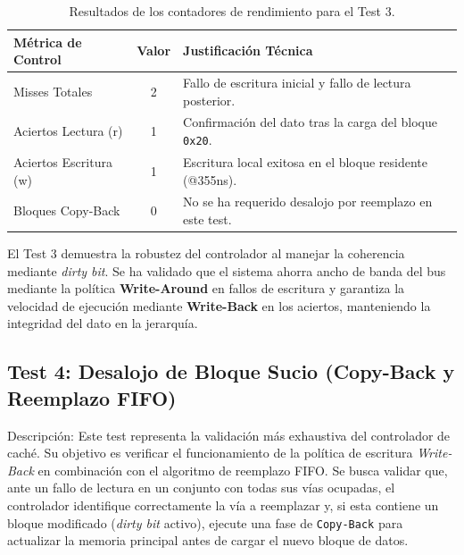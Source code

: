 \documentclass[12pt,a4paper]{article}
\begin{document}
\begin{table}[H]
\centering
\small
\renewcommand{\arraystretch}{1.2}
\begin{tabular}{|l|c|l|}
\hline
\rowcolor[HTML]{EFEFEF} 
\textbf{Métrica de Control} & \textbf{Valor} & \textbf{Justificación Técnica} \\ \hline
Misses Totales & 2 & Fallo de escritura inicial y fallo de lectura posterior. \\ \hline
Aciertos Lectura (r) & 1 & Confirmación del dato tras la carga del bloque \texttt{0x20}. \\ \hline
Aciertos Escritura (w) & 1 & Escritura local exitosa en el bloque residente (@355ns). \\ \hline
Bloques Copy-Back & 0 & No se ha requerido desalojo por reemplazo en este test. \\ \hline
\end{tabular}
\caption{Resultados de los contadores de rendimiento para el Test 3.}
\end{table}


El Test 3 demuestra la robustez del controlador al manejar la coherencia mediante \textit{dirty bit}. Se ha validado que el sistema ahorra ancho de banda del bus mediante la política \textbf{Write-Around} en fallos de escritura y garantiza la velocidad de ejecución mediante \textbf{Write-Back} en los aciertos, manteniendo la integridad del dato en la jerarquía.
\newpage
\subsection{Test 4: Desalojo de Bloque Sucio (Copy-Back y Reemplazo FIFO)}

Descripción: Este test representa la validación más exhaustiva del controlador de caché. Su objetivo es verificar el funcionamiento de la política de escritura \textit{Write-Back} en combinación con el algoritmo de reemplazo FIFO. Se busca validar que, ante un fallo de lectura en un conjunto con todas sus vías ocupadas, el controlador identifique correctamente la vía a reemplazar y, si esta contiene un bloque modificado (\textit{dirty bit} activo), ejecute una fase de \texttt{Copy-Back} para actualizar la memoria principal antes de cargar el nuevo bloque de datos.
\end{document}
